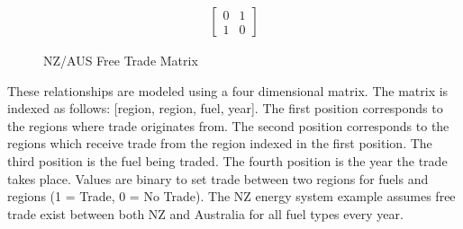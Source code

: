 \documentclass[12pt]{article}
\begin{document}
\begin{figure}
	\begin{align*}
	\begin{bmatrix}
		0 & 1 \\
		1 & 0 
	\end{bmatrix}
	\end{align*}
	\caption{NZ/AUS Free Trade Matrix}
	\label{fig:TR}
\end{figure}
These relationships are modeled using a four dimensional matrix. The matrix is indexed as follows: [region, region, fuel, year].
The first position corresponds to the regions where trade originates from. The second position corresponds to the regions which receive trade from the region indexed in the first position.
The third position is the fuel being traded. The fourth position is the year the trade takes place.
Values are binary to set trade between two regions for fuels and regions (1 = Trade, 0 = No Trade).
The NZ energy system example assumes free trade exist between both NZ and Australia for all fuel types every year.
\end{document}

